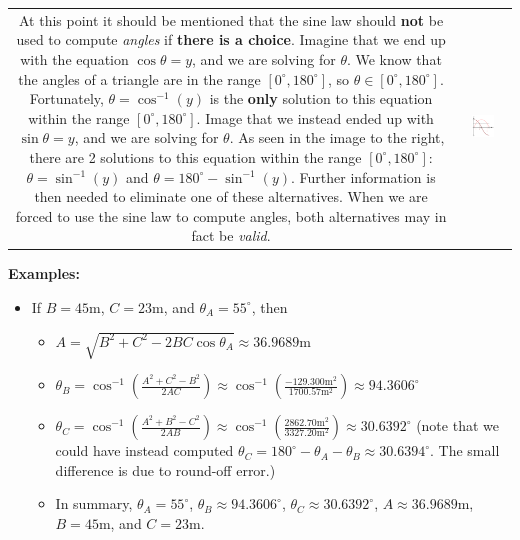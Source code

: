 \documentclass{article}
\begin{document}
\begin{tabular}{cc}
\parbox{0.5\textwidth}{
At this point it should be mentioned that the sine law should {\bf not} be used to compute \emph{angles} if {\bf there is a choice}. Imagine that we end up with the equation \(\cos\theta = y\), and we are solving for \(\theta\). We know that the angles of a triangle are in the range \([0^\circ, 180^\circ]\), so \(\theta \in [0^\circ, 180^\circ]\). Fortunately, \(\theta = \cos^{-1}(y)\) is the {\bf only} solution to this equation within the range \([0^\circ, 180^\circ]\). Image that we instead ended up with \(\sin\theta = y\), and we are solving for \(\theta\). As seen in the image to the right, there are 2 solutions to this equation within the range \([0^\circ, 180^\circ]\): \(\theta = \sin^{-1}(y)\) and \(\theta = 180^\circ - \sin^{-1}(y)\). Further information is then needed to eliminate one of these alternatives. When we are forced to use the sine law to compute angles, both alternatives may in fact be \emph{valid}. 
} & \parbox{0.5\textwidth}{
\includegraphics[width = 0.5\textwidth]{dont_use_sine_for_angles}
} 
\end{tabular}

{\bf Examples:}
\begin{itemize}
\item If \(B = 45\text{m}\), \(C = 23\text{m}\), and \(\theta_A = 55^\circ\), then 
	\begin{itemize}
	\item[\textasteriskcentered] \(A = \sqrt{B^2 + C^2 - 2BC\cos\theta_A} \approx 36.9689\text{m}\)
	\item[\textasteriskcentered] \(\theta_B = \cos^{-1}\left(\frac{A^2 + C^2 - B^2}{2AC}\right) \approx \cos^{-1}\left(\frac{-129.300\text{m}^2}{1700.57\text{m}^2}\right) \approx 94.3606^\circ\)
	\item[\textasteriskcentered] \(\theta_C = \cos^{-1}\left(\frac{A^2 + B^2 - C^2}{2AB}\right) \approx \cos^{-1}\left(\frac{2862.70\text{m}^2}{3327.20\text{m}^2}\right) \approx 30.6392^\circ\) (note that we could have instead computed \(\theta_C = 180^\circ - \theta_A - \theta_B \approx 30.6394^\circ\). The small difference is due to round-off error.)
	\item[\textasteriskcentered] In summary, \(\theta_A = 55^\circ\), \(\theta_B \approx 94.3606^\circ\), \(\theta_C \approx 30.6392^\circ\), \(A \approx 36.9689\text{m}\), \(B = 45\text{m}\), and \(C = 23\text{m}\).
	\end{itemize}
\end{itemize}
\end{document}
